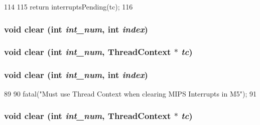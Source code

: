 \begin{DoxyCode}
114     {
115         return interruptsPending(tc);
116     }
\end{DoxyCode}
\hypertarget{classMipsISA_1_1Interrupts_af60c3484087379d0330467d77f6cbaae}{
\subsubsection[{clear}]{\setlength{\rightskip}{0pt plus 5cm}void clear (int {\em int\_\-num}, \/  int {\em index})}}
\label{classMipsISA_1_1Interrupts_af60c3484087379d0330467d77f6cbaae}
\hypertarget{classMipsISA_1_1Interrupts_a10ed3ba8ce3bd81e1732b0a9a7087a27}{
\subsubsection[{clear}]{\setlength{\rightskip}{0pt plus 5cm}void clear (int {\em int\_\-num}, \/  {\bf ThreadContext} $\ast$ {\em tc})}}
\label{classMipsISA_1_1Interrupts_a10ed3ba8ce3bd81e1732b0a9a7087a27}
\hypertarget{classMipsISA_1_1Interrupts_af60c3484087379d0330467d77f6cbaae}{
\subsubsection[{clear}]{\setlength{\rightskip}{0pt plus 5cm}void clear (int {\em int\_\-num}, \/  int {\em index})}}
\label{classMipsISA_1_1Interrupts_af60c3484087379d0330467d77f6cbaae}



\begin{DoxyCode}
89 {
90     fatal("Must use Thread Context when clearing MIPS Interrupts in M5");
91 }
\end{DoxyCode}
\hypertarget{classMipsISA_1_1Interrupts_a10ed3ba8ce3bd81e1732b0a9a7087a27}{
\subsubsection[{clear}]{\setlength{\rightskip}{0pt plus 5cm}void clear (int {\em int\_\-num}, \/  {\bf ThreadContext} $\ast$ {\em tc})}}
\label{classMipsISA_1_1Interrupts_a10ed3ba8ce3bd81e1732b0a9a7087a27}



